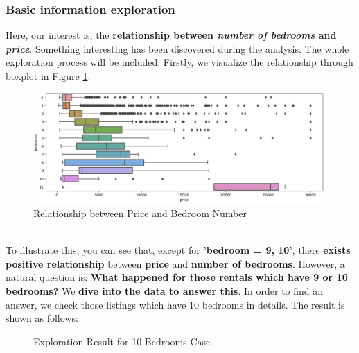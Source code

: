 \documentclass{article}
\begin{document}
	\subsubsection{Basic information exploration}
	Here, our interest is, the \textbf{relationship between \textit{number of bedrooms} and \textit{price}}. Something interesting has been discovered during the analysis. The whole exploration process will be included. Firstly, we visualize the relationship through boxplot in Figure \ref{fig:006}:
	\begin{figure}[h]
		\centering
		\includegraphics[width=.4\textheight]{price_bednum.png}
		\caption{Relationship between Price and Bedroom Number}
		\label{fig:006}
	\end{figure}
	\\
	To illustrate this, you can see that, except for \textbf{'bedroom = 9, 10'}, there \textbf{exists positive relationship} between \textbf{price} and \textbf{number of bedrooms}. However, a natural question is: \textbf{What happened for those rentals which have 9 or 10 bedrooms? } We \textbf{dive into the data to answer this}. In order to find an answer, we check those listings which have 10 bedrooms in details. The result is shown as follows:
	\begin{figure}[h]
		\centering
		\caption{Exploration Result for 10-Bedrooms Case}
		\label{fig:007} %
	\end{figure}
\end{document}
